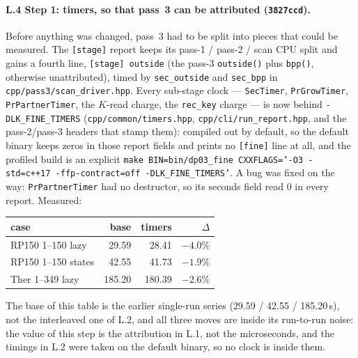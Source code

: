 \documentclass[11pt]{article}
\begin{document}
\paragraph{L.4 Step 1: timers, so that pass~3 can be attributed (\texttt{3827ccd}).} Before anything was changed, pass~3 had to be split into pieces that could be measured. The \texttt{[stage]} report keeps its pass-1 / pass-2 / scan CPU split and gains a fourth line, \texttt{[stage] outside} (the pass-3 \texttt{outside()} plus \texttt{bpp()}, otherwise unattributed), timed by \texttt{sec\_outside} and \texttt{sec\_bpp} in \texttt{cpp/pass3/scan\_driver.hpp}. Every sub-stage clock --- \texttt{SecTimer}, \texttt{PrGrowTimer}, \texttt{PrPartnerTimer}, the $K$-read charge, the \texttt{rec\_key} charge --- is now behind \texttt{-DLK\_FINE\_TIMERS} (\texttt{cpp/common/timers.hpp}, \texttt{cpp/cli/run\_report.hpp}, and the pass-2/pass-3 headers that stamp them): compiled out by default, so the default binary keeps zeros in those report fields and prints no \texttt{[fine]} line at all, and the profiled build is an explicit
\texttt{make BIN=bin/dp03\_fine CXXFLAGS='-O3 -std=c++17 -ffp-contract=off -DLK\_FINE\_TIMERS'}.
A bug was fixed on the way: \texttt{PrPartnerTimer} had no destructor, so its seconds field read 0 in every report. Measured:
\begin{center}
\begin{tabular}{@{}lrrr@{}}
\toprule
case & base & timers & $\Delta$ \\
\midrule
RP150 1--150 lazy & 29.59 & 28.41 & $-4.0\%$ \\
RP150 1--150 states & 42.55 & 41.73 & $-1.9\%$ \\
Ther 1--349 lazy & 185.20 & 180.39 & $-2.6\%$ \\
\bottomrule
\end{tabular}
\end{center}
The base of this table is the earlier single-run series (29.59 / 42.55 / 185.20\,s), not the interleaved one of L.2, and all three moves are inside its run-to-run noise: the value of this step is the attribution in L.1, not the microseconds, and the timings in L.2 were taken on the default binary, so no clock is inside them.
\end{document}
